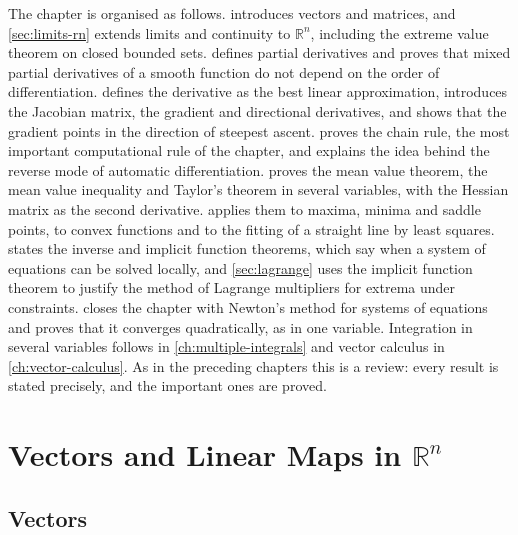 The chapter is organised as follows.  introduces vectors and matrices, and \cref{sec:limits-rn} extends limits and continuity to $\mathbb R^n$, including the extreme value theorem on closed bounded sets.  defines partial derivatives and proves that mixed partial derivatives of a smooth function do not depend on the order of differentiation.  defines the derivative as the best linear approximation, introduces the Jacobian matrix, the gradient and directional derivatives, and shows that the gradient points in the direction of steepest ascent.  proves the chain rule, the most important computational rule of the chapter, and explains the idea behind the reverse mode of automatic differentiation.  proves the mean value theorem, the mean value inequality and Taylor's theorem in several variables, with the Hessian matrix as the second derivative.  applies them to maxima, minima and saddle points, to convex functions and to the fitting of a straight line by least squares.  states the inverse and implicit function theorems, which say when a system of equations can be solved locally, and \cref{sec:lagrange} uses the implicit function theorem to justify the method of Lagrange multipliers for extrema under constraints.  closes the chapter with Newton's method for systems of equations and proves that it converges quadratically, as in one variable. Integration in several variables follows in \cref{ch:multiple-integrals} and vector calculus in \cref{ch:vector-calculus}. As in the preceding chapters this is a review: every result is stated precisely, and the important ones are proved.

\section{Vectors and Linear Maps in \texorpdfstring{$\mathbb R^n$}{R\^{}n}}
\label{sec:vectors-rn}

\subsection{Vectors}

